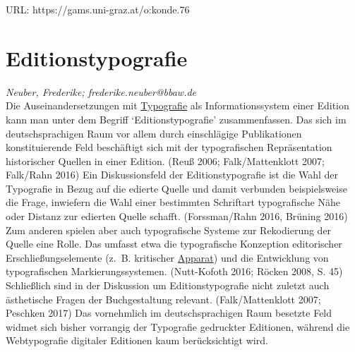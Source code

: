 \documentclass{article}
\begin{document}
URL: https://gams.uni-graz.at/o:konde.76\newpage\section*{Editionstypografie} \emph{Neuber, Frederike; frederike.neuber@bbaw.de }\\
        
    Die Auseinandersetzungen mit \href{http://gams.uni-graz.at/o:konde.200}{Typografie} als Informationssystem einer Edition kann man unter dem Begriff ‘Editionstypografie’ zusammenfassen. Das sich im deutschsprachigen Raum vor allem durch einschlägige Publikationen konstituierende Feld beschäftigt sich mit der typografischen Repräsentation historischer Quellen in einer Edition. (Reuß 2006; Falk/Mattenklott 2007; Falk/Rahn 2016) Ein Diskussionsfeld der Editionstypografie ist die Wahl der Typografie in Bezug auf die edierte Quelle und damit verbunden beispielsweise die Frage, inwiefern die Wahl einer bestimmten Schriftart typografische Nähe oder Distanz zur edierten Quelle schafft. (Forssman/Rahn 2016, Brüning 2016) Zum anderen spielen aber auch typografische Systeme zur Rekodierung der Quelle eine Rolle. Das umfasst etwa die typografische Konzeption editorischer Erschließungselemente (z. B. kritischer \href{http://gams.uni-graz.at/o:konde.32}{Apparat}) und die Entwicklung von typografischen Markierungssystemen. (Nutt-Kofoth 2016; Röcken 2008, S. 45) Schließlich sind in der Diskussion um Editionstypografie nicht zuletzt auch ästhetische Fragen der Buchgestaltung relevant. (Falk/Mattenklott 2007; Peschken 2017) Das vornehmlich im deutschsprachigen Raum besetzte Feld widmet sich bisher vorrangig der Typografie gedruckter Editionen, während die Webtypografie digitaler Editionen kaum berücksichtigt wird.\\
            
\end{document}
